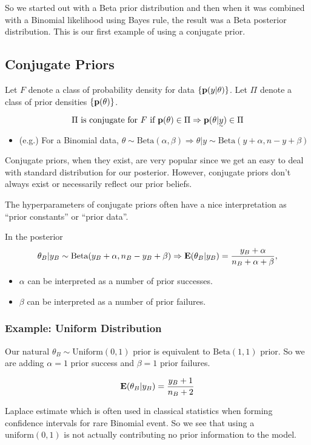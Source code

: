 So we started out with a Beta prior distribution and then when it was combined with a Binomial likelihood using Bayes rule, the result was a Beta posterior distribution. This is our first example of using a conjugate prior.

\subsection{Conjugate Priors}

Let $F$ denote a class of probability density for data $\{{\mathbf p}(y|\theta)\}$. Let $\Pi$ denote a class of prior densities $\{{\mathbf p}(\theta)\}$.

\[
\Pi \text{ is conjugate for $F$ if } \p(\theta) \in \Pi \Rightarrow \p(\theta| \vec{y}) \in \Pi
\]

\begin{itemize}
    \item (e.g.) For a Binomial data, $\theta \sim \text{Beta}(\alpha, \beta) \Rightarrow \theta| y \sim \text{Beta}(y+\alpha, n-y+\beta)$
\end{itemize}

Conjugate priors, when they exist, are very popular since we get an easy to deal with standard distribution for our posterior. However, conjugate priors don't always exist or necessarily reflect our prior beliefs.

The hyperparameters of conjugate priors often have a nice interpretation as ``prior constants'' or ``prior data''.

In the posterior
\[
    \theta_B | y_B \sim \text{Beta}(y_B+\alpha, n_B-y_B+\beta) \Rightarrow {\mathbf E}(\theta_B| y_B) = \frac{y_B + \alpha}{n_B + \alpha + \beta},
\]
\begin{itemize}
    \item $\alpha$ can be interpreted as a number of prior successes.
    \item $\beta$ can be interpreted as a number of prior failures.
\end{itemize}
\subsubsection*{Example: Uniform Distribution}
Our natural $\theta_B \sim \text{Uniform}(0, 1)$ prior is equivalent to $\text{Beta}(1, 1)$ prior. So we are adding $\alpha=1$ prior success and $\beta=1$ prior failures.

\[
{\mathbf E}(\theta_B | y_B) = \frac{y_B + 1}{n_B + 2}
\]

Laplace estimate which is often used in classical statistics when forming confidence intervals for rare Binomial event. So we see that using a $\text{uniform}(0, 1)$ is not actually contributing no prior information to the model.

